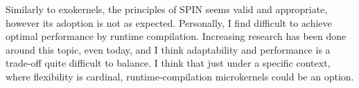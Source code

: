 \documentclass[a4paper,10pt]{scrartcl}
\begin{document}
Similarly to exokernels, the principles of SPIN seems valid and appropriate, however its adoption is not as expected.  Personally, I find difficult to achieve optimal performance by runtime compilation.  Increasing research has been done around this topic, even today, and  I think adaptability and performance is a trade-off quite difficult to balance.  I think that just under a specific context, where flexibility is cardinal, runtime-compilation microkernels could be an option.    

\end{document}
